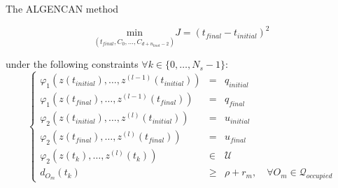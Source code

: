 The ALGENCAN method








\begin{equation}
	\underset{(t_{final},C_0,\dotsc,C_{d+n_{knot}-2})}{\mathrm{min}} J = (t_{final}-t_{initial})^{2}
\end{equation}

under the following constraints $\forall k \in \{0,\dotsc,N_s -1\}$:
\begin{equation}%
\left\lbrace\begin{array}{lcl}
    \varphi_1(z(t_{initial}),\dotsc,z^{(l-1)}(t_{initial})) & = & q_{initial}\\
    \varphi_1(z(t_{final}),\dotsc,z^{(l-1)}(t_{final})) & = & q_{final}\\
    \varphi_2(z(t_{initial}),\dotsc,z^{(l)}(t_{initial})) & = & u_{initial}\\
    \varphi_2(z(t_{final}),\dotsc,z^{(l)}(t_{final}))& = & u_{final}\\
    \varphi_2(z(t_k),\dotsc,z^{(l)}(t_k)) &\in& \mathcal{U}\\
    d_{O_m}(t_k) &\geq& \rho + r_m,\quad \forall O_m \in \mathcal{Q}_{occupied}
\end{array}\right.
\end{equation}

